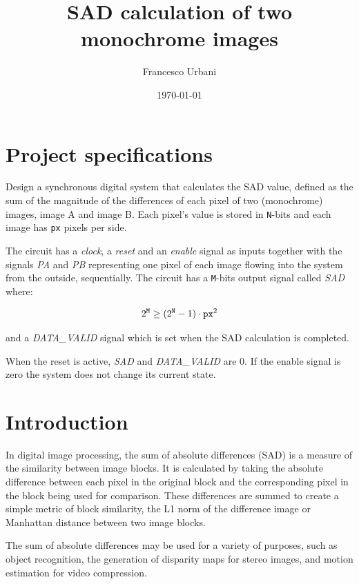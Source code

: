 \documentclass[12pt, a4paper]{article}
\title{SAD calculation of two monochrome images}
\author{Francesco Urbani}
\date{\today}
\begin{document}
\maketitle

\newpage
\tableofcontents

\newpage 
\listoffigures
\newpage

\section{Project specifications}


Design a synchronous digital system that calculates the SAD value, defined as the sum of the magnitude of the differences of each pixel of two (monochrome) images, image A and image B. Each pixel's value is stored in \texttt{N}-bits and each image has \texttt{px} pixels per side.

The circuit has a \textit{clock}, a \textit{reset} and an \textit{enable} signal as inputs together with the signals \textit{PA} and \textit{PB} representing one pixel of each image flowing into the system from the outside, sequentially.
The circuit has a \texttt{M}-bits output signal called \textit{SAD} where:

\begin{equation}
    2^\texttt{M} \ge (2^\texttt{N}-1) \cdot \mbox{\texttt{px}}^2
\end{equation}

and a \textit{DATA\_VALID} signal which is set when the SAD calculation is completed.

When the reset is active, \textit{SAD} and \textit{DATA\_VALID} are 0. If the enable signal is zero the system does not change its current state.



\newpage

\section{Introduction}

In digital image processing, the sum of absolute differences (SAD) is a measure of the similarity between image blocks. It is calculated by taking the absolute difference between each pixel in the original block and the corresponding pixel in the block being used for comparison. These differences are summed to create a simple metric of block similarity, the L1 norm of the difference image or Manhattan distance between two image blocks.

The sum of absolute differences may be used for a variety of purposes, such as object recognition, the generation of disparity maps for stereo images, and motion estimation for video compression.
\newline
\end{document}

